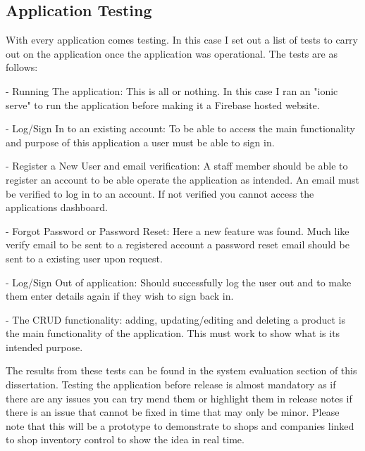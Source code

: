 \subsection{Application Testing}

With every application comes testing. In this case I set out a list of tests to carry out on the application once the application was operational.
The tests are as follows:
\newline

- Running The application: This is all or nothing. In this case I ran an "ionic serve" to run the application before making it a Firebase hosted website.
\newline

- Log/Sign In to an existing account: To be able to access the main functionality and purpose of this application a user must be able to sign in. 
\newline

- Register a New User and email verification: A staff member should be able to register an account to be able operate the application as intended. An email must be verified to log in to an account. If not verified you cannot access the applications dashboard.
\newline

- Forgot Password or Password Reset: Here a new feature was found. Much like verify email to be sent to a registered account a password reset email should be sent to a existing user upon request. 
\newline

- Log/Sign Out of application: Should successfully log the user out and to make them enter details again if they wish to sign back in.
\newline

- The CRUD functionality: adding, updating/editing and deleting a product is the main functionality of the application. This must work to show what is its intended purpose. \newline

The results from these tests can be found in the system evaluation section of this dissertation. Testing the application before release is almost mandatory as if there are any issues you can try mend them or highlight them in release notes if there is an issue that cannot be fixed in time that may only be minor. Please note that this will be a prototype to demonstrate to shops and companies linked to shop inventory control to show the idea in real time.


